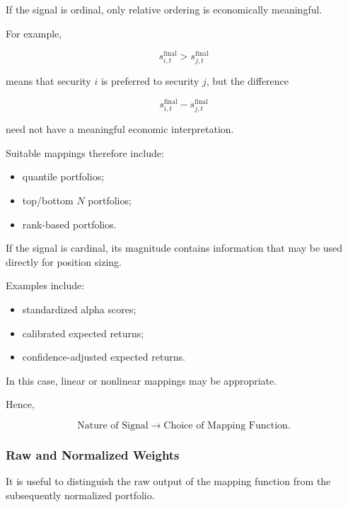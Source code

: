 \documentclass[11pt,a4paper]{article}
\begin{document}
If the signal is ordinal, only relative ordering is economically meaningful.

For example,

\begin{equation}
s_{i,t}^{\mathrm{final}}
>
s_{j,t}^{\mathrm{final}}
\end{equation}

means that security $i$ is preferred to security $j$, but the difference

\begin{equation}
s_{i,t}^{\mathrm{final}}
-
s_{j,t}^{\mathrm{final}}
\end{equation}

need not have a meaningful economic interpretation.

Suitable mappings therefore include:

\begin{itemize}
    \item quantile portfolios;
    \item top/bottom $N$ portfolios;
    \item rank-based portfolios.
\end{itemize}

If the signal is cardinal, its magnitude contains information that may be used
directly for position sizing.

Examples include:

\begin{itemize}
    \item standardized alpha scores;
    \item calibrated expected returns;
    \item confidence-adjusted expected returns.
\end{itemize}

In this case, linear or nonlinear mappings may be appropriate.

Hence,

\begin{equation}
\boxed{
\text{Nature of Signal}
\rightarrow
\text{Choice of Mapping Function}.
}
\end{equation}


\subsubsection{Raw and Normalized Weights}

It is useful to distinguish the raw output of the mapping function from the
subsequently normalized portfolio.
\end{document}
